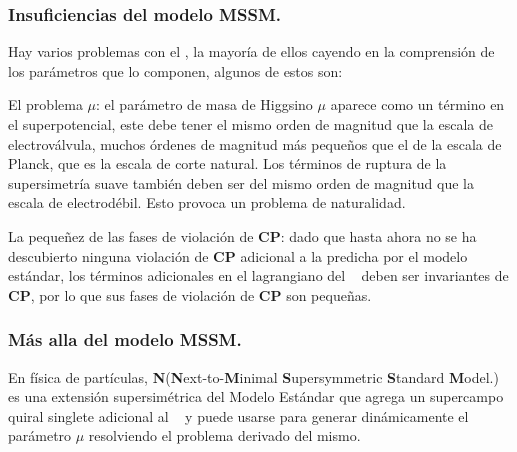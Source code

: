 \subsubsection{Insuficiencias del modelo MSSM.}
Hay varios problemas con el \MSSM, la mayoría de ellos cayendo en la comprensión de los parámetros que lo componen, algunos de estos son:
\begin{itemize_f}
\item[-] El problema $\mu$: el parámetro de masa de Higgsino $\mu$ aparece como un término en el superpotencial, este debe tener el mismo orden de magnitud que la escala de electroválvula, muchos órdenes de magnitud más pequeños que el de la escala de Planck, que es la escala de corte natural. Los términos de ruptura de la supersimetría suave también deben ser del mismo orden de magnitud que la escala de electrodébil. Esto provoca un problema de naturalidad.
\item[-] La pequeñez de las fases de violación de \textbf{CP}: dado que hasta ahora no se ha descubierto ninguna violación de \textbf{CP} adicional a la predicha por el modelo estándar, los términos adicionales en el lagrangiano del \MSSM ~ deben ser invariantes de \textbf{CP}, por lo que sus fases de violación de \textbf{CP} son pequeñas.
\end{itemize_f}

\subsubsection{Más alla del modelo MSSM.}
En física de partículas, \textbf{N}\MSSM(\textbf{N}ext-to-\textbf{M}inimal \textbf{S}upersymmetric \textbf{S}tandard \textbf{M}odel.) es una extensión supersimétrica del Modelo Estándar que agrega un supercampo quiral singlete adicional al \MSSM ~ y puede usarse para generar dinámicamente el parámetro $\mu$ resolviendo el problema derivado del mismo.


